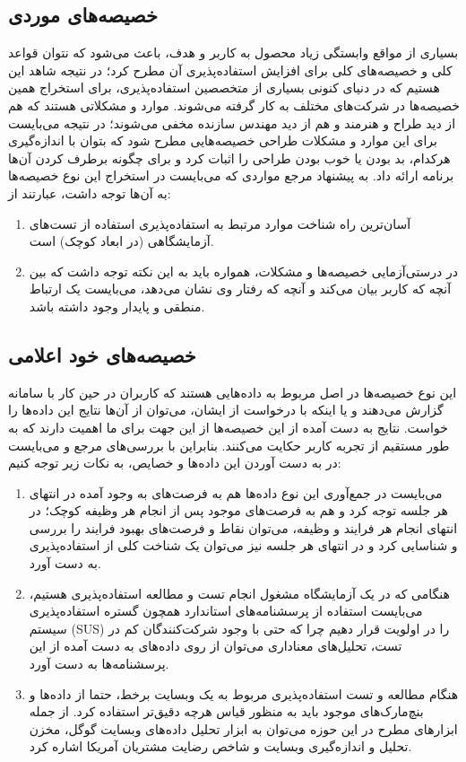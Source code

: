 \subsection{خصیصه‌های موردی}
بسیاری از مواقع وابستگی زیاد محصول به کاربر و هدف، باعث می‌شود که نتوان قواعد کلی و خصیصه‌های کلی برای افزایش استفاده‌پذیری آن مطرح کرد؛ در نتیجه شاهد این هستیم که در دنیای کنونی بسیاری از متخصصین استفاده‌پذیری، برای استخراج همین خصیصه‌ها در شرکت‌های مختلف به کار گرفته می‌شوند. موارد و مشکلاتی هستند که هم از دید طراح و هنرمند و هم از دید مهندس سازنده مخفی می‌شوند؛ در نتیجه می‌بایست برای این موارد و مشکلات طراحی خصیصه‌هایی مطرح شود که بتوان با اندازه‌گیری هرکدام، بد بودن یا خوب بودن طراحی را اثبات کرد و برای چگونه برطرف کردن آن‌ها برنامه ارائه داد. به پیشنهاد مرجع
\cite{albert_measuring_2013}
مواردی که می‌بایست در استخراج این نوع خصیصه‌ها به آن‌ها توجه داشت، عبارتند از:
\begin{enumerate}
	\item 
	آسان‌ترین راه شناخت موارد مرتبط به استفاده‌پذیری استفاده از تست‌های آزمایشگاهی (در ابعاد کوچک) است.
	\item 
	در درستی‌آزمایی خصیصه‌ها و مشکلات، همواره باید به این نکته توجه داشت که بین آنچه که کاربر بیان می‌کند و آنچه که رفتار وی نشان می‌دهد، می‌بایست یک ارتباط منطقی و پایدار وجود داشته باشد.
\end{enumerate}
\subsection{خصیصه‌های خود اعلامی}
این نوع خصیصه‌ها در اصل مربوط به داده‌هایی هستند که کاربران در حین کار با سامانه گزارش می‌دهند و یا اینکه با درخواست از ایشان، می‌توان از آن‌ها نتایج این داده‌ها را خواست. نتایج به دست آمده از این خصیصه‌ها از این جهت برای ما اهمیت دارند که به طور مستقیم از تجربه کاربر حکایت می‌کنند. بنابراین با بررسی‌های مرجع
\cite{albert_measuring_2013} و
\cite{pressman_software_2015}
می‌بایست در به دست آوردن این داده‌ها و خصایص، به نکات زیر توجه کنیم:
\begin{enumerate}
	\item
	می‌بایست در جمع‌آوری این نوع داده‌ها هم به فرصت‌های به وجود آمده در انتهای هر جلسه توجه کرد و هم به فرصت‌های موجود پس از انجام هر وظیفه کوچک؛ در انتهای انجام هر فرایند و وظیفه، می‌توان نقاط و فرصت‌های بهبود فرایند را بررسی و شناسایی کرد و در انتهای هر جلسه نیز می‌توان یک شناخت کلی از استفاده‌پذیری به دست آورد.
	\item 
	هنگامی که در یک آزمایشگاه مشغول انجام تست و مطالعه استفاده‌پذیری هستیم، می‌بایست استفاده از پرسشنامه‌های استاندارد همچون گستره استفاده‌پذیری سیستم (SUS)
را در اولویت قرار دهیم چرا که حتی با وجود شرکت‌کنندگان کم در تست، تحلیل‌های معناداری می‌توان از روی داده‌های به دست آمده از این پرسشنامه‌ها به دست آورد.
\item 
هنگام مطالعه و تست استفاده‌پذیری مربوط به یک وبسایت برخط، حتما از داده‌ها و بنچ‌مارک‌های موجود باید به منظور قیاس هرچه دقیق‌تر استفاده کرد. از جمله ابزارهای مطرح در این حوزه می‌توان به ابزار تحلیل داده‌های وبسایت گوگل،
مخزن تحلیل و اندازه‌گیری وبسایت و شاخص رضایت مشتریان آمریکا اشاره کرد.
\end{enumerate}
